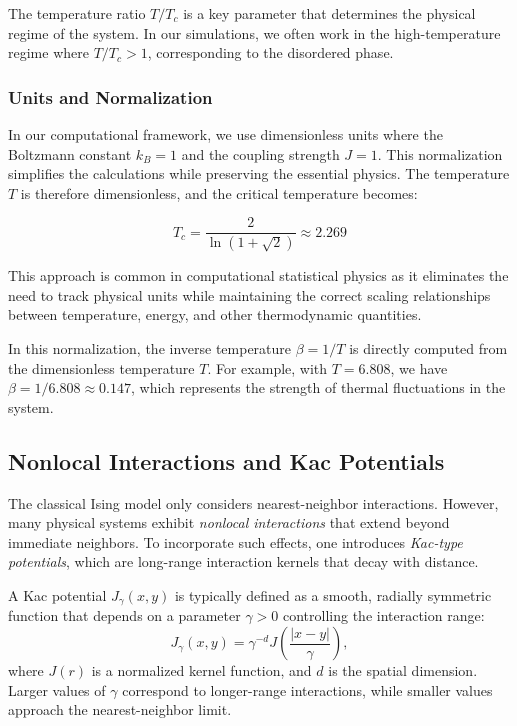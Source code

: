 \documentclass[11pt,a4paper]{article}
\begin{document}
The temperature ratio $T/T_c$ is a key parameter that determines the physical regime of the system. In our simulations, we often work in the high-temperature regime where $T/T_c > 1$, corresponding to the disordered phase.

\subsubsection{Units and Normalization}

In our computational framework, we use dimensionless units where the Boltzmann constant $k_B = 1$ and the coupling strength $J = 1$. This normalization simplifies the calculations while preserving the essential physics. The temperature $T$ is therefore dimensionless, and the critical temperature becomes:

\begin{equation}
T_c = \frac{2}{\ln(1 + \sqrt{2})} \approx 2.269
\end{equation}

This approach is common in computational statistical physics as it eliminates the need to track physical units while maintaining the correct scaling relationships between temperature, energy, and other thermodynamic quantities.

In this normalization, the inverse temperature $\beta = 1/T$ is directly computed from the dimensionless temperature $T$. For example, with $T = 6.808$, we have $\beta = 1/6.808 \approx 0.147$, which represents the strength of thermal fluctuations in the system.

\subsection{Nonlocal Interactions and Kac Potentials}

The classical Ising model only considers nearest-neighbor interactions. 
However, many physical systems exhibit \emph{nonlocal interactions} that extend beyond immediate neighbors. 
To incorporate such effects, one introduces \emph{Kac-type potentials}, which are long-range interaction kernels that decay with distance.

A Kac potential $J_\gamma(x,y)$ is typically defined as a smooth, radially symmetric function that depends on a parameter $\gamma > 0$ controlling the interaction range:
\begin{equation}
    J_\gamma(x, y) = \gamma^{-d} J\left(\frac{|x - y|}{\gamma}\right),
\end{equation}
where $J(r)$ is a normalized kernel function, and $d$ is the spatial dimension. Larger values of $\gamma$ correspond to longer-range interactions, while smaller values approach the nearest-neighbor limit.
\end{document}
